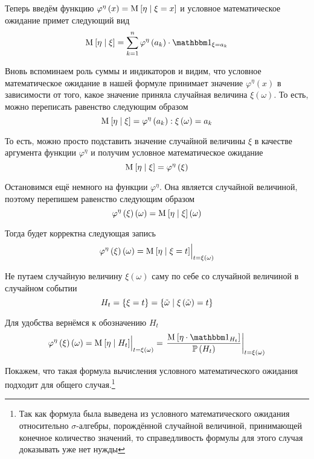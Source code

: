Теперь введём функцию
$\varphi^{\eta}\left( x \right) = \operatorname{M}_{} \left[  \eta \;\middle|\; \xi=x  \right]$
и условное математическое ожидание примет следующий вид
$$\Mean{ \eta \mcond \xi }
    = \sum_{k=1}^n \varphi^{\eta}\left( a_k \right)
        \cdot \indicatorof{\xi = a_k}$$

Вновь вспоминаем роль суммы и индикаторов и видим,
что условное математическое ожидание в нашей формуле
принимает значение $\varphi^{\eta}\left( x \right)$ в зависимости от того,
какое значение приняла случайная величина $\xi\left( \omega \right)$.
То есть, можно переписать равенство следующим образом
$$\operatorname{M}_{} \left[  \eta \;\middle|\; \xi  \right]
    = \varphi^{\eta}\left( a_k \right): \xi\left( \omega \right) = a_k$$

То есть, можно просто подставить значение случайной величины $\xi$
в качестве аргумента функции $\varphi^{\eta}$
и получим условное математическое ожидание
$$\operatorname{M}_{} \left[  \eta \;\middle|\; \xi  \right]
    = \varphi^{\eta}\left( \xi \right)$$

Остановимся ещё немного на функции $\varphi^{\eta}$.
Она является случайной величиной, поэтому перепишем равенство следующим образом
$$\varphi^{\eta}\left( \xi \right)\left( \omega \right)
    = \operatorname{M}_{} \left[  \eta \;\middle|\; \xi  \right]\left( \omega \right)$$

Тогда будет корректна следующая запись
$$\varphi^{\eta}\left( \xi \right)\left( \omega \right)
    = \Bigl. \operatorname{M}_{} \left[  \eta \;\middle|\; \xi = t  \right]
        \Bigr|_{t=\xi\left( \omega \right)}$$

Не путаем случайную величину $\xi\left( \omega \right)$ саму по себе
со случайной величиной в случайном событии
$$H_t = \left\{ \xi = t \right\}
    = \left\{ \tilde{\omega}\;\middle|\; \xi\left( \tilde{\omega} \right) = t \right\}$$

Для удобства вернёмся к обозначению $H_t$
$$\varphi^{\eta}\left( \xi \right)\left( \omega \right)
    = \Bigl. \Mean{ \eta \mcond H_t }
        \Bigr|_{t=\xi\left( \omega \right)}
    = \left. \frac{\Mean{ \eta \cdot \indicatorof{H_t} }}
        {\probability{H_t}} \right|_{t=\xi\left( \omega \right)}$$

Покажем, что такая формула вычисления условного математического ожидания
подходит для общего случая.\footnote{Так как формула была выведена из
условного математического ожидания относительно $\sigma$-алгебры,
порождённой случайной величиной, принимающей конечное количество значений,
то справедливость формулы для этого случая доказывать уже нет нужды}

